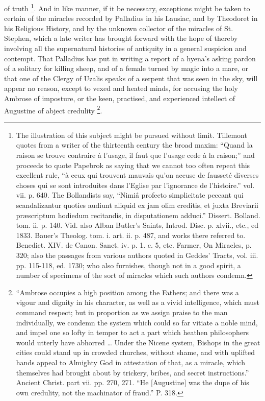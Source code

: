of truth \footnote{The illustration of this subject might be pursued without limit.
Tillemont quotes from a writer of the thirteenth century the broad
maxim: ``Quand la raison se trouve contraire à l'usage, il faut que l'usage
cede à la raison;'' and proceeds to quote Papebrok as saying that we
cannot too often repeat this excellent rule, ``à ceux qui trouvent
mauvais qu'on accuse de fausseté diverses choses qui se sont
introduites dans l'Eglise par l'ignorance de l'histoire.'' vol. vii. p.
640. The Bollandists say, ``Nimiâ profecto simplicitate peccant qui
scandalizantur quoties audiunt aliquid ex jam olim creditis, et juxta
Breviarii præscriptum hodiedum recitandis, in disputationem adduci.''
Dissert. Bolland. tom. ii. p. 140. Vid. also Alban Butler's Saints,
Introd. Disc. p. xlvii., etc., ed 1833. Bauer's Theolog. tom. i. art.
ii. p. 487, and works there referred to. Benedict. XIV. de Canon.
Sanct. iv. p. 1. c. 5, etc. Farmer, On Miracles, p. 320; also the
passages from various authors quoted in Geddes' Tracts, vol. iii. pp.
115-118, ed. 1730; who also furnishes, though not in a good spirit,
a number of specimens of the sort of miracles which such authors
condemn.}. And in like
manner, if it be necessary, exceptions might be taken to certain of
the miracles recorded by Palladius in his Lausiac, and by Theodoret in
his Religious History, and by the unknown collector of the miracles of
St. Stephen, which a late writer has brought forward with the hope of
thereby involving all the supernatural histories of antiquity in
a general suspicion and contempt. That Palladius has put in writing a
report of a hyena's asking pardon of a solitary for killing sheep, and
of a female turned by magic into a mare, or that one of the Clergy of
Uzalis speaks of a serpent that was seen in the sky, will appear no
reason, except to vexed and heated minds, for accusing the holy
Ambrose of imposture, or the keen, practised, and experienced
intellect of Augustine of abject credulity \footnote{``Ambrose occupies a high position among the Fathers; and there
was a vigour and dignity in his character, as well as a vivid
intelligence, which must command respect; but in proportion as we
assign praise to the man individually, we condemn the system which
could so far vitiate a noble mind, and impel one so lofty in temper to
act a part which heathen philosophers would utterly have abhorred …
Under the Nicene system, Bishops in the great cities could stand up in
crowded churches, without shame, and with uplifted hands appeal to
Almighty God in attestation of that, as a miracle, which themselves
had brought about by trickery, bribes, and secret instructions.''
Ancient Christ. part vii. pp. 270, 271. ``He [Augustine] was the
dupe of his own credulity, not the machinator of fraud.'' P. 318.}.


